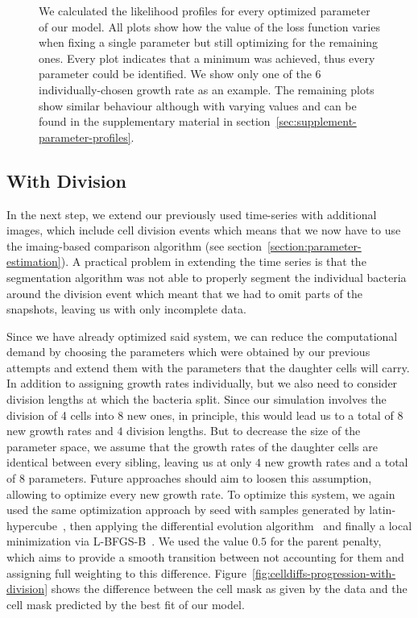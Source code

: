 \documentclass{article}
\begin{document}
\begin{figure}
\begin{tikzonimage}[width=0.25\textwidth]
    \end{tikzonimage}%
    \caption{
        We calculated the likelihood profiles for every optimized parameter of our model.
        All plots show how the value of the loss function varies when fixing a single parameter but
        still optimizing for the remaining ones.
        Every plot indicates that a minimum was achieved, thus every parameter could be identified.
        We show only one of the 6 individually-chosen growth rate as an example.
        The remaining plots show similar behaviour although with varying values and can be found in
        the supplementary material in section~\ref{sec:supplement-parameter-profiles}.
    }
    \label{fig:parameter-estimates-single-step}
\end{figure}

\subsection{With Division}

In the next step, we extend our previously used time-series with additional images, which include
cell division events which means that we now have to use the imaing-based comparison algorithm (see
section~\ref{section:parameter-estimation}).
A practical problem in extending the time series is that the segmentation algorithm was not able to
properly segment the individual bacteria around the division event which meant that we had to omit
parts of the snapshots, leaving us with only incomplete data.

Since we have already optimized said system, we can reduce the computational demand by choosing the
parameters which were obtained by our previous attempts and extend them with the parameters that the
daughter cells will carry.
In addition to assigning growth rates individually, but we also need to consider division lengths at
which the bacteria split.
Since our simulation involves the division of 4 cells into 8 new ones, in principle, this would lead
us to a total of $8$ new growth rates and $4$ division lengths.
But to decrease the size of the parameter space, we assume that the growth rates of the daughter
cells are identical between every sibling, leaving us at only $4$ new growth rates and a total of
$8$ parameters.
Future approaches should aim to loosen this assumption, allowing to optimize every new growth rate.
To optimize this system, we again used the same optimization approach by seed with samples generated
by latin-hypercube~\cite{McKay1979}, then applying the differential evolution
algorithm~\cite{Storn1997} and finally a local minimization via L-BFGS-B~\cite{Liu1989}.
We used the value $0.5$ for the parent penalty, which aims to provide a smooth transition between
not accounting for them and assigning full weighting to this difference.
Figure~\ref{fig:celldiffs-progression-with-division} shows the difference between the cell mask as
given by the data and the cell mask predicted by the best fit of our model.
\end{document}
